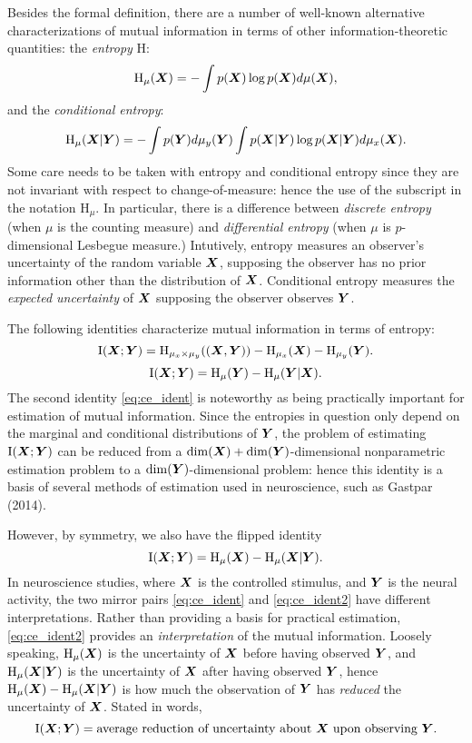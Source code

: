 \documentclass[12pt]{article}
\begin{document}
Besides the formal definition, there are a number of well-known alternative
characterizations of mutual information in terms of other
information-theoretic quantities: the \emph{entropy} $\text{H}$:
\[
\text{H}_\mu(\boldsymbol{X}) = -\int p(\boldsymbol{X}) \log p(\boldsymbol{X}) d\mu(\boldsymbol{X}),
\]
and the \emph{conditional entropy}:
\[
\text{H}_\mu(\boldsymbol{X}|\boldsymbol{Y}) = -\int p(\boldsymbol{Y}) d\mu_y(\boldsymbol{Y}) \int p(\boldsymbol{X}|\boldsymbol{Y}) \log p(\boldsymbol{X}|\boldsymbol{Y}) d\mu_x(\boldsymbol{X}).
\]
Some care needs to be taken with entropy and conditional entropy since
they are not invariant with respect to change-of-measure: hence the
use of the subscript in the notation $\text{H}_\mu$.  In particular,
there is a difference between \emph{discrete entropy} (when $\mu$ is
the counting measure) and \emph{differential entropy} (when $\mu$ is
$p$-dimensional Lesbegue measure.)  Intutively, entropy measures an
observer's uncertainty of the random variable $\boldsymbol{X}$, supposing the
observer has no prior information other than the distribution of
$\boldsymbol{X}$. Conditional entropy measures the \emph{expected uncertainty} of
$\boldsymbol{X}$ supposing the observer observes $\boldsymbol{Y}$.

The following identities characterize mutual information in terms of entropy:
\[
\text{I}(\boldsymbol{X}; \boldsymbol{Y}) = \text{H}_{\mu_x \times \mu_y}((\boldsymbol{X}, \boldsymbol{Y})) - \text{H}_{\mu_x}(\boldsymbol{X}) - \text{H}_{\mu_y}(\boldsymbol{Y}).
\]
\begin{equation}\label{eq:ce_ident}
\text{I}(\boldsymbol{X}; \boldsymbol{Y}) = \text{H}_\mu(\boldsymbol{Y}) - \text{H}_\mu(\boldsymbol{Y}|\boldsymbol{X}).
\end{equation}
The second identity \eqref{eq:ce_ident} is noteworthy
as being practically important for estimation of mutual information.
Since the entropies in question only depend on the marginal and
conditional distributions of $\boldsymbol{Y}$, the problem of estimating
$\text{I}(\boldsymbol{X}; \boldsymbol{Y})$ can be reduced from a $\dim(\boldsymbol{X})
+ \dim(\boldsymbol{Y})$-dimensional nonparametric estimation problem to a
$\dim(\boldsymbol{Y})$-dimensional problem: hence this identity is a basis of
several methods of estimation used in neuroscience, such as Gastpar
(2014).

However, by symmetry, we also have the flipped identity
\begin{equation}\label{eq:ce_ident2}
\text{I}(\boldsymbol{X}; \boldsymbol{Y}) = \text{H}_\mu(\boldsymbol{X}) - \text{H}_\mu(\boldsymbol{X}|\boldsymbol{Y}).
\end{equation}
In neuroscience studies, where $\boldsymbol{X}$ is the controlled stimulus, and
$\boldsymbol{Y}$ is the neural activity, the two mirror pairs \eqref{eq:ce_ident}
and \eqref{eq:ce_ident2} have different interpretations.  Rather than
providing a basis for practical estimation, \eqref{eq:ce_ident2}
provides an \emph{interpretation} of the mutual information.  Loosely
speaking, $\text{H}_\mu(\boldsymbol{X})$ is the uncertainty of $\boldsymbol{X}$ before
having observed $\boldsymbol{Y}$, and $\text{H}_\mu(\boldsymbol{X}|\boldsymbol{Y})$ is the uncertainty
of $\boldsymbol{X}$ after having observed $\boldsymbol{Y}$, hence $\text{H}_\mu(\boldsymbol{X})
- \text{H}_\mu(\boldsymbol{X}|\boldsymbol{Y})$ is how much the observation of $\boldsymbol{Y}$
has \emph{reduced} the uncertainty of $\boldsymbol{X}$.  Stated in words,
\[
\text{I}(\boldsymbol{X}; \boldsymbol{Y}) = \text{average reduction of uncertainty about $\boldsymbol{X}$ upon observing $\boldsymbol{Y}$}.
\]
\end{document}
